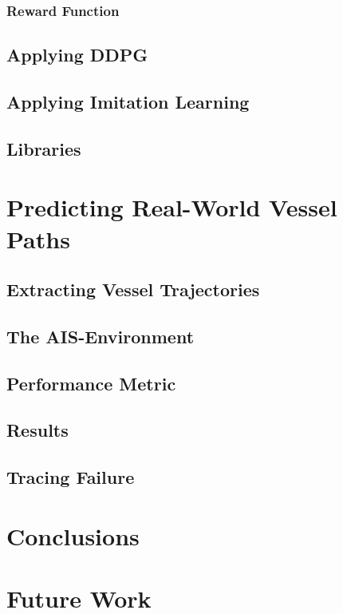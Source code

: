         \subsubsection{Reward Function}
        
        
    \subsection{Applying DDPG}
    \subsection{Applying Imitation Learning}
    \subsection{Libraries}
    
    
\newpage
\section{Predicting Real-World Vessel Paths}\label{chap:realworld}

    \subsection{Extracting Vessel Trajectories}
    
    \subsection{The AIS-Environment}
    
    \subsection{Performance Metric}
    
    \subsection{Results}
    \subsection{Tracing Failure}
    
 
\newpage   
\section{Conclusions}
\newpage
\section{Future Work}



